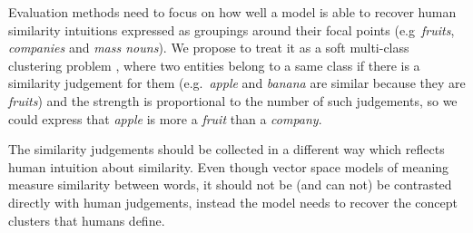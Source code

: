 \documentclass[11pt]{article}
\begin{document}

Evaluation methods need to focus on how well a model is able to recover human similarity intuitions expressed as groupings around their focal points (e.g~\textit{fruits}, \textit{companies} and \textit{mass nouns}). We propose to treat it as a soft multi-class clustering problem \cite{White:2015:WSE:2838931.2838932}, where two entities belong to a same class if there is a similarity judgement for them (e.g.~\textit{apple} and \textit{banana} are similar because they are \textit{fruits}) and the strength is proportional to the number of such judgements, so we could express that \textit{apple} is more a \textit{fruit} than a \textit{company}.

The similarity judgements should be collected in a different way which reflects human intuition about similarity. Even though vector space models of meaning measure similarity between words, it should not be (and can not) be contrasted directly with human judgements, instead the model needs to recover the concept clusters that humans define.





\balance
\end{document}
